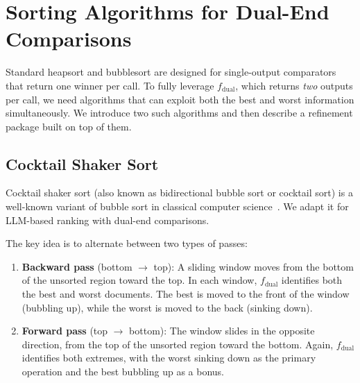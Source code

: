 \section{Sorting Algorithms for Dual-End Comparisons}
\label{sec:algorithms}

Standard heapsort and bubblesort are designed for single-output comparators that return one winner per call. To fully leverage $f_{\text{dual}}$, which returns \emph{two} outputs per call, we need algorithms that can exploit both the best and worst information simultaneously. We introduce two such algorithms and then describe a refinement package built on top of them.

\subsection{Cocktail Shaker Sort}

Cocktail shaker sort (also known as bidirectional bubble sort or cocktail sort) is a well-known variant of bubble sort in classical computer science~\citep{knuth1997art}. We adapt it for LLM-based ranking with dual-end comparisons.

The key idea is to alternate between two types of passes:
\begin{enumerate}[leftmargin=*]
\item \textbf{Backward pass} (bottom $\to$ top): A sliding window moves from the bottom of the unsorted region toward the top. In each window, $f_{\text{dual}}$ identifies both the best and worst documents. The best is moved to the front of the window (bubbling up), while the worst is moved to the back (sinking down).
\item \textbf{Forward pass} (top $\to$ bottom): The window slides in the opposite direction, from the top of the unsorted region toward the bottom. Again, $f_{\text{dual}}$ identifies both extremes, with the worst sinking down as the primary operation and the best bubbling up as a bonus.
\end{enumerate}


